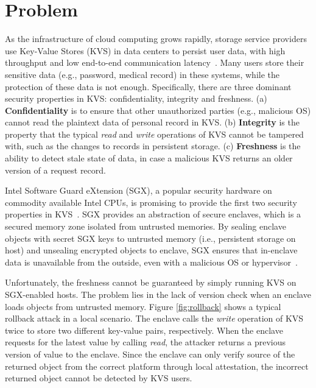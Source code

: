 \section{Problem}\label{problem}

As the infrastructure of cloud computing grows rapidly, storage service providers use Key-Value Stores (KVS) 
in data centers to persist user data, with high throughput and low end-to-end communication latency~\cite{seeger2009key, paksula2010persisting}.
Many users store their sensitive data (e.g., password, medical record) in these systems, while the protection 
of these data is not enough. 
Specifically, there are three dominant security properties in KVS: confidentiality, integrity and freshness.
(a) \textbf{Confidentiality} is to ensure that other unauthorized parties (e.g., malicious OS) cannot read the plaintext 
data of personal record in KVS. (b) \textbf{Integrity} is the property that the typical \textit{read} and \textit{write} 
operations of KVS cannot be tampered with, such as the changes to records in persistent storage. (c) \textbf{Freshness}
is the ability to detect stale state of data, in case a malicious KVS returns an older version of a request record.

Intel Software Guard eXtension (SGX), a popular security hardware on commodity available Intel CPUs, is promising 
to provide the first two security properties in KVS~\cite{sgxexplained}. SGX provides an abstraction of secure enclaves, which is a secured 
memory zone isolated from untrusted memories. By sealing enclave objects with secret SGX keys to untrusted memory (i.e., 
persistent storage on host) and unsealing encrypted objects to enclave, SGX ensures that in-enclave data is unavailable 
from the outside, even with a malicious OS or hypervisor~\cite{sgxsidechannel}.

Unfortunately, the freshness cannot be guaranteed by simply running KVS on SGX-enabled hosts. 
The problem lies in the lack of version check when an enclave loads objects from untrusted memory.
Figure \ref{fig:rollback} shows a typical rollback attack in a local scenario. The enclave calls the \textit{write} 
operation of KVS twice to store two different key-value pairs, respectively. When the enclave
requests for the latest value by calling \textit{read}, the attacker returns a previous version of value 
to the enclave. Since the enclave can only verify source of the returned object from the correct platform
through local attestation, the incorrect returned object cannot be detected by KVS users.

